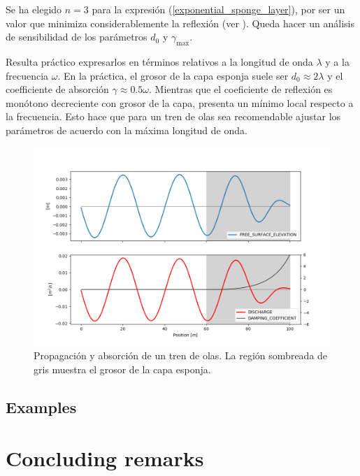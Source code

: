 Se ha elegido $n=3$ para la expresión (\ref{exponential_sponge_layer}), por ser un valor que minimiza considerablemente la reflexión (ver \cite{carmigniani2018}). Queda hacer un análisis de sensibilidad de los parámetros $d_0$ y $\gamma_{\max}$.

Resulta práctico expresarlos en términos relativos a la longitud de onda $\lambda$ y a la frecuencia $\omega$. En la práctica, el grosor de la capa esponja suele ser $d_0 \approx 2\lambda$ y el coefficiente de absorción $\gamma \approx 0.5\omega$. Mientras que el coeficiente de reflexión es monótono decreciente con grosor de la capa, presenta un mínimo local respecto a la frecuencia. Esto hace que para un tren de olas sea recomendable ajustar los parámetros de acuerdo con la máxima longitud de onda.


\begin{figure}
    \centering
    \includegraphics[width=.8\textwidth]{img/absorbing_boundary.png}
    \caption{Propagación y absorción de un tren de olas. La región sombreada de gris muestra el grosor de la capa esponja.}
    \label{absorbing_boundary}
\end{figure}


\subsection{Examples}



\section{Concluding remarks}


